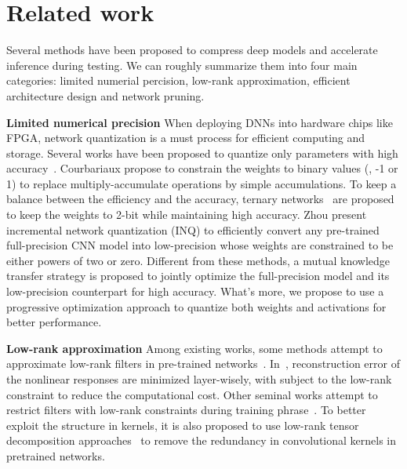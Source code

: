 \section{Related work}
\label{sec:related_work}

Several methods have been proposed to compress deep models and accelerate inference during testing. We can roughly summarize them into four main categories: limited numerial percision, low-rank approximation, efficient architecture design and network pruning. 

\textbf{Limited numerical precision}
When deploying DNNs into hardware chips like FPGA, network quantization is a must process for efficient computing and storage. Several works have been proposed to quantize only parameters with high accuracy~\cite{courbariaux2015binaryconnect, zhu2016trained,  zhou2017incremental}. Courbariaux \etal \cite{courbariaux2015binaryconnect} propose to constrain the weights to binary values (\ie, -1 or 1) to replace multiply-accumulate operations by simple accumulations. To keep a balance between the efficiency and the accuracy, ternary networks~\cite{zhu2016trained} are proposed to keep the weights to 2-bit while maintaining high accuracy. Zhou \etal \cite{zhou2017incremental} present incremental network quantization (INQ) to efficiently convert any pre-trained full-precision CNN model into low-precision whose weights are constrained to be either powers of two or zero. Different from these methods, a mutual knowledge transfer strategy is proposed to jointly optimize the full-precision model and its low-precision counterpart for high accuracy. What's more, we propose to use a progressive optimization approach to quantize both weights and activations for better performance. 

\textbf{Low-rank approximation}
Among existing works, some methods attempt to approximate low-rank filters in pre-trained networks~\cite{kim2015compression, zhang2016accelerating}. In~\cite{zhang2016accelerating}, reconstruction error of the nonlinear responses are minimized layer-wisely, with subject to the low-rank constraint to reduce the computational cost. 
Other seminal works attempt to restrict filters with low-rank constraints during training phrase~\cite{novikov2015tensorizing, tai2015convolutional}. To better exploit the structure in kernels, it is also proposed to use low-rank tensor decomposition approaches~\cite{denton2014exploiting, novikov2015tensorizing} to remove the redundancy in convolutional kernels in pretrained networks.

